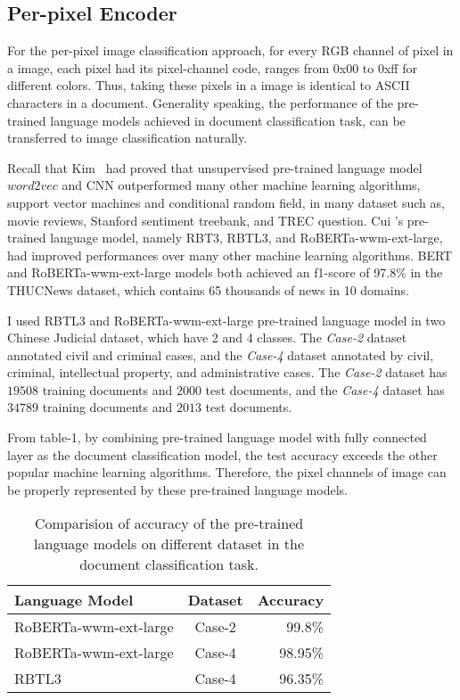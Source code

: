 \documentclass[review]{cvpr}
\begin{document}
\subsection{Per-pixel Encoder}

For the per-pixel image classification approach, for every RGB channel of pixel in a image,
each pixel had its pixel-channel code, ranges from 0x00 to 0xff for different colors.
Thus, taking these pixels in a image is identical to ASCII characters in a document.
Generality speaking, the performance of the pre-trained language models achieved in document classification task, can be transferred to image classification naturally.

\par Recall that Kim~\cite{kim2014convolutional} had proved that unsupervised pre-trained language model $word2vec$ and CNN outperformed many other machine learning algorithms,
\eg support vector machines and conditional random field, in many dataset such as, movie reviews, Stanford sentiment treebank, and TREC question.
Cui \etal's pre-trained language model, namely RBT3, RBTL3, and RoBERTa-wwm-ext-large, had improved performances over many other machine learning algorithms.
BERT and RoBERTa-wwm-ext-large models both achieved an f1-score of 97.8\% in the THUCNews dataset, which contains 65 thousands of news in 10 domains.

\par I used RBTL3 and RoBERTa-wwm-ext-large pre-trained language model in two Chinese Judicial dataset, which have 2 and 4 classes.
The \textit{Case-2} dataset annotated civil and criminal cases, and the \textit{Case-4} dataset annotated by civil, criminal, intellectual property, and administrative cases.
The \textit{Case-2} dataset has $19508$ training documents and $2000$ test documents, and the \textit{Case-4} dataset has $34789$ training documents and $2013$ test documents.

\par From table-1, by combining pre-trained language model with fully connected layer as the document classification model,
the test accuracy exceeds the other popular machine learning algorithms.
Therefore, the pixel channels of image can be properly represented by these pre-trained language models.

\begin{table}
\begin{center}
\begin{tabular}{|l|c|r|}
\hline
Language Model 	& Dataset & Accuracy \\
\hline\hline
RoBERTa-wwm-ext-large & Case-2	&	99.8\% \\
RoBERTa-wwm-ext-large & Case-4	&	98.95\% \\
RBTL3  & Case-4	&	96.35\% \\
\hline
\end{tabular}
\end{center}
\caption{Comparision of accuracy of the pre-trained language models on different dataset in the document classification task.}
\end{table}
\end{document}
